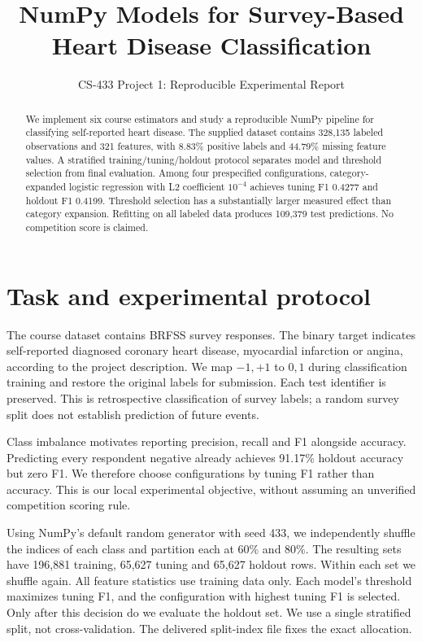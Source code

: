 \documentclass[10pt,conference,compsocconf]{IEEEtran}
\begin{document}
\title{NumPy Models for Survey-Based Heart Disease Classification}
\author{CS-433 Project 1: Reproducible Experimental Report}
\maketitle
\begin{abstract}
We implement six course estimators and study a reproducible NumPy pipeline for classifying self-reported heart disease. The supplied dataset contains 328,135 labeled observations and 321 features, with 8.83\% positive labels and 44.79\% missing feature values. A stratified training/tuning/holdout protocol separates model and threshold selection from final evaluation. Among four prespecified configurations, category-expanded logistic regression with L2 coefficient $10^{-4}$ achieves tuning F1 0.4277 and holdout F1 0.4199. Threshold selection has a substantially larger measured effect than category expansion. Refitting on all labeled data produces 109,379 test predictions. No competition score is claimed.
\end{abstract}

\section{Task and experimental protocol}
The course dataset contains BRFSS survey responses. The binary target indicates self-reported diagnosed coronary heart disease, myocardial infarction or angina, according to the project description. We map $-1,+1$ to $0,1$ during classification training and restore the original labels for submission. Each test identifier is preserved. This is retrospective classification of survey labels; a random survey split does not establish prediction of future events.

Class imbalance motivates reporting precision, recall and F1 alongside accuracy. Predicting every respondent negative already achieves 91.17\% holdout accuracy but zero F1. We therefore choose configurations by tuning F1 rather than accuracy. This is our local experimental objective, without assuming an unverified competition scoring rule.

Using NumPy's default random generator with seed 433, we independently shuffle the indices of each class and partition each at 60\% and 80\%. The resulting sets have 196,881 training, 65,627 tuning and 65,627 holdout rows. Within each set we shuffle again. All feature statistics use training data only. Each model's threshold maximizes tuning F1, and the configuration with highest tuning F1 is selected. Only after this decision do we evaluate the holdout set. We use a single stratified split, not cross-validation. The delivered split-index file fixes the exact allocation.
\end{document}
